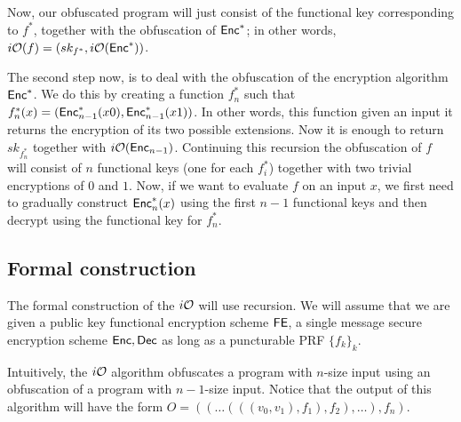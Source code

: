 Now, our obfuscated program will just consist of the functional key corresponding to $f^*$, together with the obfuscation of $\mathsf{Enc}^*$; in other words, $i\mathcal{O}(f)=(sk_{f^*},i\mathcal{O}(\mathsf{Enc}^*))$.

The second step now, is to deal with the obfuscation of the encryption algorithm $\mathsf{Enc}^*$. We do this by creating a function $f^*_n$ such that $f^*_n(x)= (\mathsf{Enc}^*_{n-1}(x0),\mathsf{Enc}^*_{n-1}(x1))$. In other words, this function given an input it returns the encryption of its two possible extensions. Now it is enough to return $sk_{f^*_n}$ together with $i\mathcal{O}(\mathsf{Enc}_{n-1})$. Continuing this recursion the obfuscation of $f$ will consist of $n$ functional keys  (one for each $f^*_{i}$) together with two trivial encryptions of $0$ and $1$. Now, if we want to evaluate $f$ on an input $x$, we first need to gradually construct $\mathsf{Enc}^*_n(x)$ using the first $n-1$ functional keys and then decrypt using the functional key for $f^*_n$.

\subsection{Formal construction}
The formal construction of the $i\mathcal{O}$ will use recursion. We will assume that we are given a public key functional encryption scheme $\mathsf{FE}$, a single message secure encryption scheme $\mathsf{Enc},\mathsf{Dec}$ as long as a puncturable PRF $\{f_k\}_k$.

\begin{figure}[h!]
\centering
{}
\end{figure}
Intuitively, the $i\mathcal{O}$ algorithm obfuscates a program with $n$-size input using an obfuscation of a program with $n-1$-size input. Notice that the output of this algorithm will have the form $O=((\ldots(((v_0,v_1),f_1),f_2),\ldots),f_n)$.



